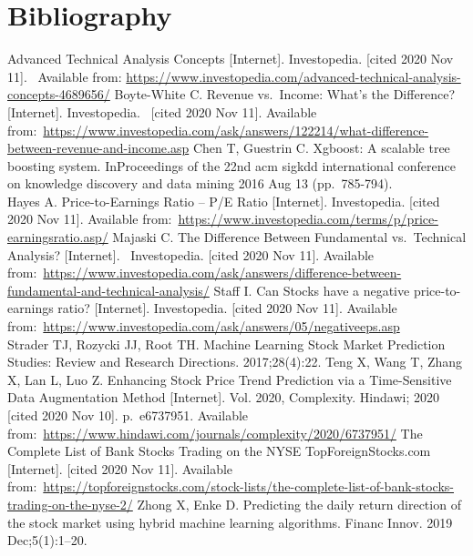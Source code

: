 \documentclass[11pt,]{article}
\begin{document}
\hypertarget{bibliography}{%
\section{\texorpdfstring{Bibliography\\
}{Bibliography }}\label{bibliography}}

Advanced Technical Analysis Concepts {[}Internet{]}. Investopedia.
{[}cited 2020 Nov 11{]}.~ Available from:
\url{https://www.investopedia.com/advanced-technical-analysis-concepts-4689656/}
Boyte-White C. Revenue vs.~Income: What's the Difference?
{[}Internet{]}. Investopedia.~ {[}cited 2020 Nov 11{]}. Available
from:~\url{https://www.investopedia.com/ask/answers/122214/what-difference-between-revenue-and-income.asp}
Chen T, Guestrin C. Xgboost: A scalable tree boosting system.
InProceedings of the 22nd acm sigkdd international conference on
knowledge discovery and data mining 2016 Aug 13 (pp.~785-794).\\
Hayes A. Price-to-Earnings Ratio -- P/E Ratio {[}Internet{]}.
Investopedia. {[}cited 2020 Nov 11{]}. Available
from:~\url{https://www.investopedia.com/terms/p/price-earningsratio.asp/}
Majaski C. The Difference Between Fundamental vs.~Technical Analysis?
{[}Internet{]}.~ Investopedia. {[}cited 2020 Nov 11{]}. Available
from:~\url{https://www.investopedia.com/ask/answers/difference-between-fundamental-and-technical-analysis/}
Staff I. Can Stocks have a negative price-to-earnings ratio?
{[}Internet{]}. Investopedia. {[}cited 2020 Nov 11{]}. Available
from:~\url{https://www.investopedia.com/ask/answers/05/negativeeps.asp}\\
Strader TJ, Rozycki JJ, Root TH. Machine Learning Stock Market
Prediction Studies: Review and Research Directions. 2017;28(4):22. Teng
X, Wang T, Zhang X, Lan L, Luo Z. Enhancing Stock Price Trend Prediction
via a Time-Sensitive Data Augmentation Method {[}Internet{]}. Vol. 2020,
Complexity. Hindawi; 2020 {[}cited 2020 Nov 10{]}. p.~e6737951.
Available
from:~\url{https://www.hindawi.com/journals/complexity/2020/6737951/}
The Complete List of Bank Stocks Trading on the NYSE \textbar{}
TopForeignStocks.com {[}Internet{]}. {[}cited 2020 Nov 11{]}. Available
from:~\url{https://topforeignstocks.com/stock-lists/the-complete-list-of-bank-stocks-trading-on-the-nyse-2/}
Zhong X, Enke D. Predicting the daily return direction of the stock
market using hybrid machine learning algorithms. Financ Innov. 2019
Dec;5(1):1--20.





\newpage
\singlespacing 
\end{document}
